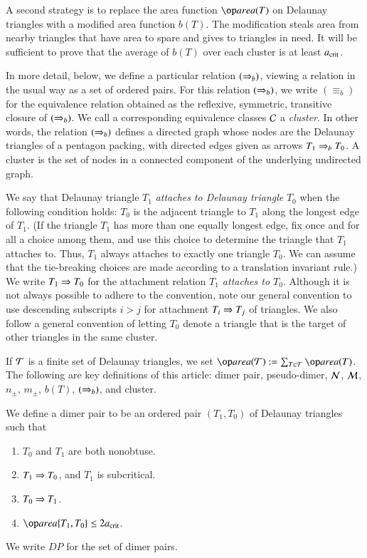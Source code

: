 A second strategy is to replace the area function $\area(T)$ on
Delaunay triangles with a modified area function $b(T)$.  The
modification steals area from nearby triangles that have area to spare
and gives to triangles in need.  It will be sufficient to prove that
the average of $b(T)$ over each cluster is at least $a_\text{crit}$.

In more detail, below, we define a particular relation $(\Rightarrow_{b})$,
viewing a relation in the usual way as a set of ordered pairs.  For
this relation $(\Rightarrow_{b})$, we write ${(\equiv_{b})}$ for the equivalence
relation obtained as the reflexive, symmetric, transitive closure of
$(\Rightarrow_{b})$.  We call a corresponding equivalence classes $\mathcal C$ a {\it
  cluster}.  In other words, the relation $(\Rightarrow_{b})$ defines a directed
graph whose nodes are the Delaunay triangles of a pentagon packing,
with directed edges given as arrows $T_1\Rightarrow_{b} T_0$.  A cluster is the
set of nodes in a connected component of the underlying undirected
graph.

We say that Delaunay triangle $T_1$ {\it attaches to Delaunay
  triangle} $T_0$ when the following condition holds: $T_0$ is the
adjacent triangle to $T_1$ along the longest edge of $T_1$.  (If the
triangle $T_1$ has more than one equally longest edge, fix once and
for all a choice among them, and use this choice to determine the
triangle that $T_1$ attaches to.  Thus, $T_1$ always attaches to
exactly one triangle $T_0$.  We can assume that the tie-breaking
choices are made according to a translation invariant rule.)  We write
$T_1 \Rightarrow T_0$ for the attachment relation {\it $T_1$ attaches to
  $T_0$}.  Although it is not always possible to adhere to the
convention, note our general convention to use descending subscripts
$i > j$ for attachment $T_i\Rightarrow T_j$ of triangles.  We also follow a
general convention of letting $T_0$ denote a triangle that is the
target of other triangles in the same cluster.

If $\mathcal T$ is a finite set of Delaunay triangles, we set
$\area(\T):=\sum_{T\in\T} \area(T)$.  The following are key
definitions of this article: dimer pair, pseudo-dimer, $\mathcal N$, $\mathcal M$,
$n_\pm$, $m_\pm$, $b(T)$, $(\Rightarrow_{b})$, and cluster.

\begin{definition}
  We define a dimer pair to be an ordered pair $(T_1,T_0)$ of Delaunay
  triangles such that
\begin{enumerate}
\item $T_0$ and $T_1$ are both nonobtuse.
\item $T_1\Rightarrow T_0$, and $T_1$ is subcritical.
\item $T_0 \Rightarrow T_1$.
\item $\area\{T_1,T_0\} \le 2\acrit$.
\end{enumerate}
We write $DP$ for the set of dimer pairs.
\end{definition}

